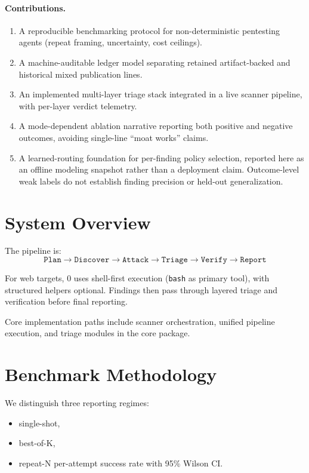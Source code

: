 \documentclass[11pt]{article}
\begin{document}
\paragraph{Contributions.}
\begin{enumerate}[leftmargin=*,itemsep=2pt]
  \item A reproducible benchmarking protocol for non-deterministic pentesting
  agents (repeat framing, uncertainty, cost ceilings).
  \item A machine-auditable ledger model separating retained artifact-backed and
  historical mixed publication lines.
  \item An implemented multi-layer triage stack integrated in a live scanner
  pipeline, with per-layer verdict telemetry.
  \item A mode-dependent ablation narrative reporting both positive and negative
  outcomes, avoiding single-line ``moat works'' claims.
  \item A learned-routing foundation for per-finding policy selection,
  reported here as an offline modeling snapshot rather than a deployment
  claim. Outcome-level weak labels do not establish finding precision
  or held-out generalization.
\end{enumerate}

\section{System Overview}

The pipeline is:
\[
\texttt{Plan} \rightarrow \texttt{Discover} \rightarrow \texttt{Attack} \rightarrow \texttt{Triage} \rightarrow \texttt{Verify} \rightarrow \texttt{Report}
\]

For web targets, 0 uses shell-first execution (\texttt{bash} as primary
tool), with structured helpers optional. Findings then pass through layered
triage and verification before final reporting.

Core implementation paths include scanner orchestration, unified pipeline
execution, and triage modules in the core package.

\section{Benchmark Methodology}

We distinguish three reporting regimes:
\begin{itemize}
  \item single-shot,
  \item best-of-K,
  \item repeat-N per-attempt success rate with 95\% Wilson CI.
\end{itemize}
\end{document}
